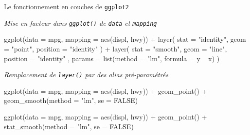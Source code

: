 \documentclass[12pt,ignorenonframetext,]{beamer}
\newenvironment{Shaded}{}{}
\newcommand{\DataTypeTok}[1]{#1}
\newcommand{\KeywordTok}[1]{\textcolor[rgb]{0.00,0.00,1.00}{#1}}
\newcommand{\NormalTok}[1]{#1}
\newcommand{\OperatorTok}[1]{#1}
\newcommand{\OtherTok}[1]{\textcolor[rgb]{1.00,0.25,0.00}{#1}}
\newcommand{\StringTok}[1]{\textcolor[rgb]{0.00,0.50,0.50}{#1}}
\renewenvironment{Shaded}{\begin{snugshade}}{\end{snugshade}}
\begin{document}
\begin{frame}[fragile]{\large Le fonctionnement en \og couches \fg{} de
\texttt{ggplot2}}
\protect\hypertarget{le-fonctionnement-en-couches-de-ggplot2-4}{}

\emph{Mise en facteur dans \texttt{ggplot()} de \texttt{data} et
\texttt{mapping}}

\footnotesize \vspace{-1mm}

\begin{Shaded}
\begin{Highlighting}[]
\KeywordTok{ggplot}\NormalTok{(}\DataTypeTok{data =}\NormalTok{ mpg, }\DataTypeTok{mapping =} \KeywordTok{aes}\NormalTok{(displ, hwy)) }\OperatorTok{+}\StringTok{ }\KeywordTok{layer}\NormalTok{(}
  \DataTypeTok{stat =} \StringTok{"identity"}\NormalTok{, }\DataTypeTok{geom =} \StringTok{"point"}\NormalTok{, }\DataTypeTok{position =} \StringTok{"identity"}
\NormalTok{) }\OperatorTok{+}\StringTok{ }\KeywordTok{layer}\NormalTok{(}
  \DataTypeTok{stat =} \StringTok{"smooth"}\NormalTok{, }\DataTypeTok{geom =} \StringTok{"line"}\NormalTok{, }\DataTypeTok{position =} \StringTok{"identity"}
\NormalTok{  , }\DataTypeTok{params =} \KeywordTok{list}\NormalTok{(}\DataTypeTok{method =} \StringTok{"lm"}\NormalTok{, }\DataTypeTok{formula =}\NormalTok{ y }\OperatorTok{~}\StringTok{ }\NormalTok{x)}
\NormalTok{)}
\end{Highlighting}
\end{Shaded}

\normalsize \vspace{-3mm}

\emph{Remplacement de \texttt{layer()} par des alias pré-paramétrés}

\footnotesize \vspace{-1mm}

\begin{Shaded}
\begin{Highlighting}[]
\KeywordTok{ggplot}\NormalTok{(}\DataTypeTok{data =}\NormalTok{ mpg, }\DataTypeTok{mapping =} \KeywordTok{aes}\NormalTok{(displ, hwy)) }\OperatorTok{+}\StringTok{ }
\StringTok{  }\KeywordTok{geom_point}\NormalTok{() }\OperatorTok{+}\StringTok{ }\KeywordTok{geom_smooth}\NormalTok{(}\DataTypeTok{method =} \StringTok{"lm"}\NormalTok{, }\DataTypeTok{se =} \OtherTok{FALSE}\NormalTok{)}
\end{Highlighting}
\end{Shaded}

\begin{Shaded}
\begin{Highlighting}[]
\KeywordTok{ggplot}\NormalTok{(}\DataTypeTok{data =}\NormalTok{ mpg, }\DataTypeTok{mapping =} \KeywordTok{aes}\NormalTok{(displ, hwy)) }\OperatorTok{+}\StringTok{ }
\StringTok{  }\KeywordTok{geom_point}\NormalTok{() }\OperatorTok{+}\StringTok{ }\KeywordTok{stat_smooth}\NormalTok{(}\DataTypeTok{method =} \StringTok{"lm"}\NormalTok{, }\DataTypeTok{se =} \OtherTok{FALSE}\NormalTok{)}
\end{Highlighting}
\end{Shaded}

\end{frame}
\end{document}
